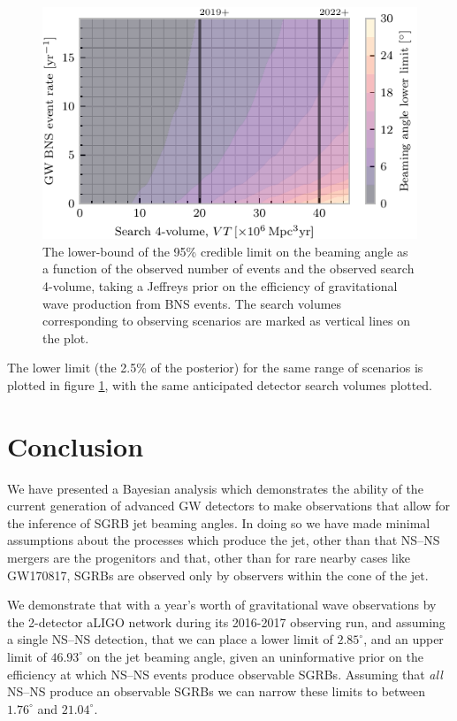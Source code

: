 \documentclass[twocolumn]{aastex61}
\newcommand{\BNS}{\ac{NS}--\ac{NS}\xspace}
\begin{document}
\begin{figure}
\centering
\includegraphics[width=\linewidth]{volume_v_nevents_lower.pdf}
\caption{\label{fig:volumevevents_lower} The lower-bound of the 95\%
  credible limit on the beaming angle as a function of the observed
  number of events and the observed search 4-volume, taking a Jeffreys
  prior on the efficiency of gravitational wave production from BNS
  events. The search volumes corresponding to observing scenarios
  are marked as vertical lines on the plot.}
\end{figure}

The lower limit (the 2.5\% of the posterior) for the same range of
scenarios is plotted in figure \ref{fig:volumevevents_lower}, with the
same anticipated detector search volumes plotted.

\section{Conclusion}

We have presented a Bayesian analysis which demonstrates the ability
of the current generation of advanced \ac{GW} detectors to make observations
that allow for the inference of \ac{SGRB} jet beaming angles. In doing so we
have made minimal assumptions about the processes which produce the jet, other
than that \BNS mergers are the progenitors and that, other than for rare nearby
cases like GW170817, \acp{SGRB} are observed only by observers within the cone
of the jet.

We demonstrate that with a year's worth of gravitational wave
observations by the 2-detector \ac{aLIGO} network during its 2016-2017
observing run, and assuming a single \BNS detection, that we can place
a lower limit of $2.85^{\circ}$, and an upper limit of $46.93^{\circ}$
on the jet beaming angle, given an uninformative prior on the
efficiency at which \BNS events produce observable
\acp{SGRB}. Assuming that \emph{all} \BNS produce an observable
\acp{SGRB} we can narrow these limits to between $1.76^{\circ}$ and
$21.04^{\circ}$.
\end{document}
